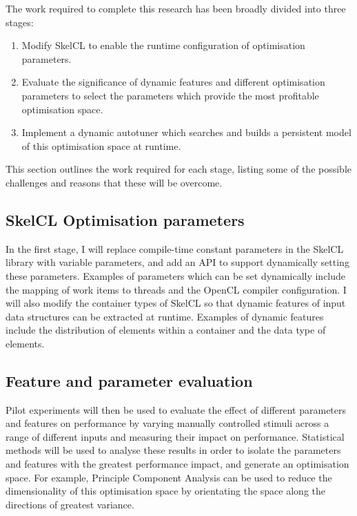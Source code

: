 The work required to complete this research has been broadly divided
into three stages:

\begin{enumerate}
\item Modify SkelCL to enable the runtime configuration of
  optimisation parameters.
\item Evaluate the significance of dynamic features and different
  optimisation parameters to select the parameters which provide the
  most profitable optimisation space.
\item Implement a dynamic autotuner which searches and builds a
  persistent model of this optimisation space at runtime.
\end{enumerate}

This section outlines the work required for each stage, listing some
of the possible challenges and reasons that these will be overcome.

\subsection{SkelCL Optimisation parameters}
In the first stage, I will replace compile-time constant parameters in
the SkelCL library with variable parameters, and add an API to support
dynamically setting these parameters. Examples of parameters which can
be set dynamically include the mapping of work items to threads and
the OpenCL compiler configuration. I will also modify the container
types of SkelCL so that dynamic features of input data structures can
be extracted at runtime. Examples of dynamic features include the
distribution of elements within a container and the data type of
elements.

\subsection{Feature and parameter evaluation}
Pilot experiments will then be used to evaluate the effect of
different parameters and features on performance by varying manually
controlled stimuli across a range of different inputs and measuring
their impact on performance. Statistical methods will be used to
analyse these results in order to isolate the parameters and features
with the greatest performance impact, and generate an optimisation
space. For example, Principle Component Analysis can be used to reduce
the dimensionality of this optimisation space by orientating the space
along the directions of greatest variance.

